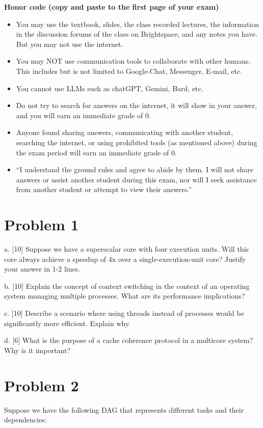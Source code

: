 \documentclass{article}
\begin{document}
\textbf{Honor code (copy and paste to the first page of your exam)}
\begin{itemize}
    \item You may use the textbook, slides, the class recorded lectures, the information in the discussion forums of the class on Brightspace, and any notes you have. But you may not use the internet.
    \item You may NOT use communication tools to collaborate with other humans. This includes but is not limited to Google-Chat, Messenger, E-mail, etc.
    \item You cannot use LLMs such as chatGPT, Gemini, Bard, etc.
    \item Do not try to search for answers on the internet, it will show in your answer, and you will earn an immediate grade of 0.
    \item Anyone found sharing answers, communicating with another student, searching the internet, or using prohibited tools (as mentioned above) during the exam period will earn an immediate grade of 0.
    \item “I understand the ground rules and agree to abide by them. I will not share answers or assist another student during this exam, nor will I seek assistance from another student or attempt to view their answers.”
\end{itemize}

\section*{Problem 1}
a. [10]  Suppose we have a superscalar core with four execution units.  Will this core always achieve a speedup of 4x over a single-execution-unit core? Justify your answer in 1-2 lines.

b. [10] Explain the concept of context switching in the context of an operating system managing multiple processes.  What are its performance implications?

c. [10] Describe a scenario where using threads instead of processes would be significantly more efficient.  Explain why.

d. [6]  What is the purpose of a cache coherence protocol in a multicore system?  Why is it important?


\section*{Problem 2}
Suppose we have the following DAG that represents different tasks and their dependencies:
\end{document}
